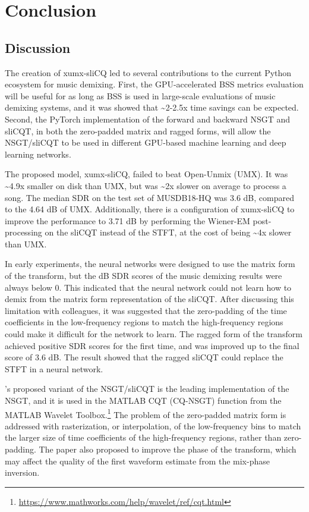 \documentclass[report.tex]{subfiles}
\begin{document}
\section{Conclusion}
\label{sec:conclusion}

\subsection{Discussion}

The creation of xumx-sliCQ led to several contributions to the current Python ecosystem for music demixing. First, the GPU-accelerated BSS metrics evaluation will be useful for as long as BSS is used in large-scale evaluations of music demixing systems, and it was showed that \textasciitilde2-2.5x time savings can be expected. Second, the PyTorch implementation of the forward and backward NSGT and sliCQT, in both the zero-padded matrix and ragged forms, will allow the NSGT/sliCQT to be used in different GPU-based machine learning and deep learning networks.

The proposed model, xumx-sliCQ, failed to beat Open-Unmix (UMX). It was \textasciitilde4.9x smaller on disk than UMX, but was \textasciitilde2x slower on average to process a song. The median SDR on the test set of MUSDB18-HQ was 3.6 dB, compared to the 4.64 dB of UMX. Additionally, there is a configuration of xumx-sliCQ to improve the performance to 3.71 dB by performing the Wiener-EM post-processing on the sliCQT instead of the STFT, at the cost of being \textasciitilde4x slower than UMX.

In early experiments, the neural networks were designed to use the matrix form of the transform, but the dB SDR scores of the music demixing results were always below 0. This indicated that the neural network could not learn how to demix from the matrix form representation of the sliCQT. After discussing this limitation with colleagues, it was suggested that the zero-padding of the time coefficients in the low-frequency regions to match the high-frequency regions could make it difficult for the network to learn. The ragged form of the transform achieved positive SDR scores for the first time, and was improved up to the final score of 3.6 dB. The result showed that the ragged sliCQT could replace the STFT in a neural network.

\textcite{variableq1}'s proposed variant of the NSGT/sliCQT is the leading implementation of the NSGT, and it is used in the MATLAB CQT (CQ-NSGT) function from the MATLAB Wavelet Toolbox.\footnote{\url{https://www.mathworks.com/help/wavelet/ref/cqt.html}} The problem of the zero-padded matrix form is addressed with rasterization, or interpolation, of the low-frequency bins to match the larger size of time coefficients of the high-frequency regions, rather than zero-padding. The paper also proposed to improve the phase of the transform, which may affect the quality of the first waveform estimate from the mix-phase inversion.
\end{document}
